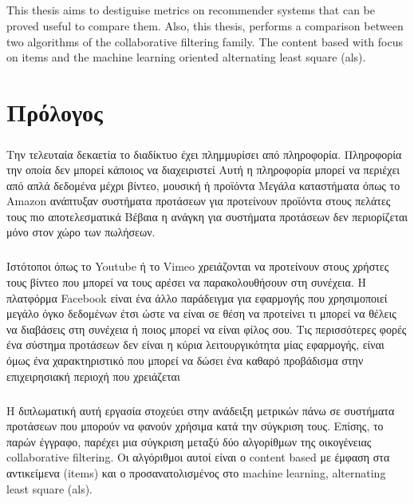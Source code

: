 \documentclass[10pt, a4paper, oneside]{journal}
\begin{document}
	\paragraph{} This thesis aims to destiguise metrics on recommender systems  that can be proved useful to compare them. Also, this thesis, performs a comparison between two algorithms of the collaborative filtering family. The content based with focus on items and the machine learning oriented alternating least square (als).
	\newpage
	\chapter{Πρόλογος}
	\paragraph{} Την τελευταία δεκαετία το διαδίκτυο έχει πλημμυρίσει από πληροφορία. Πληροφορία την οποία δεν μπορεί κάποιος να διαχειριστεί Αυτή η πληροφορία μπορεί να περιέχει από απλά δεδομένα μέχρι βίντεο, μουσική ή προϊόντα Μεγάλα καταστήματα όπως το Amazon ανάπτυξαν συστήματα προτάσεων για προτείνουν προϊόντα στους πελάτες τους πιο αποτελεσματικά Βέβαια η ανάγκη για συστήματα προτάσεων δεν περιορίζεται μόνο στον χώρο των πωλήσεων.
	
	\paragraph{} Ιστότοποι όπως το Youtube ή το Vimeo χρειάζονται να προτείνουν στους χρήστες τους βίντεο που μπορεί να τους αρέσει να παρακολουθήσουν στη συνέχεια. Η πλατφόρμα Facebook είναι ένα άλλο παράδειγμα για εφαρμογής που χρησιμοποιεί μεγάλο όγκο δεδομένων έτσι ώστε να είναι σε θέση να προτείνει τι μπορεί να θέλεις να διαβάσεις στη συνέχεια ή ποιος μπορεί να είναι φίλος σου. Τις περισσότερες φορές ένα σύστημα προτάσεων δεν είναι η κύρια λειτουργικότητα μίας εφαρμογής, είναι όμως ένα χαρακτηριστικό που μπορεί να δώσει ένα καθαρό προβάδισμα στην επιχειρησιακή περιοχή που χρειάζεται
	
	\paragraph{} Η διπλωματική αυτή εργασία στοχεύει στην ανάδειξη μετρικών πάνω σε συστήματα προτάσεων που μπορούν να φανούν χρήσιμα κατά την σύγκριση τους. Επίσης, το παρών έγγραφο, παρέχει μια σύγκριση μεταξύ δύο αλγορίθμων της οικογένειας collaborative filtering. Οι αλγόριθμοι αυτοί είναι ο content based με έμφαση στα αντικείμενα (items) και ο προσανατολισμένος στο machine learning, alternating least square (als).
	\newpage
	
\end{document}
